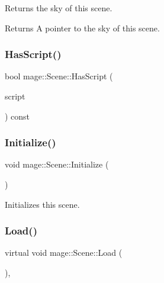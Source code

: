 Returns the sky of this scene.

\begin{DoxyReturn}{Returns}
A pointer to the sky of this scene. 
\end{DoxyReturn}
\hypertarget{classmage_1_1_scene_a9dd6c49e9db7590de1de4fbd128c78a9}{}\label{classmage_1_1_scene_a9dd6c49e9db7590de1de4fbd128c78a9} 
\subsubsection{\texorpdfstring{Has\+Script()}{HasScript()}}
{\footnotesize\ttfamily bool mage\+::\+Scene\+::\+Has\+Script (\begin{DoxyParamCaption}\item[{\hyperlink{namespacemage_a1e01ae66713838a7a67d30e44c67703e}{Shared\+Ptr}$<$ const \hyperlink{classmage_1_1_behavior_script}{Behavior\+Script} $>$}]{script }\end{DoxyParamCaption}) const}

\hypertarget{classmage_1_1_scene_a3cd12ef381ca743bf0b8f8aa2a76eb57}{}\label{classmage_1_1_scene_a3cd12ef381ca743bf0b8f8aa2a76eb57} 
\subsubsection{\texorpdfstring{Initialize()}{Initialize()}}
{\footnotesize\ttfamily void mage\+::\+Scene\+::\+Initialize (\begin{DoxyParamCaption}{ }\end{DoxyParamCaption})}

Initializes this scene. \hypertarget{classmage_1_1_scene_a1fb4a93eaa2f6a9e20594e205abb9a32}{}\label{classmage_1_1_scene_a1fb4a93eaa2f6a9e20594e205abb9a32} 
\subsubsection{\texorpdfstring{Load()}{Load()}}
{\footnotesize\ttfamily virtual void mage\+::\+Scene\+::\+Load (\begin{DoxyParamCaption}{ }\end{DoxyParamCaption})\hspace{0.3cm}{\ttfamily [private]}, {\ttfamily [virtual]}}

